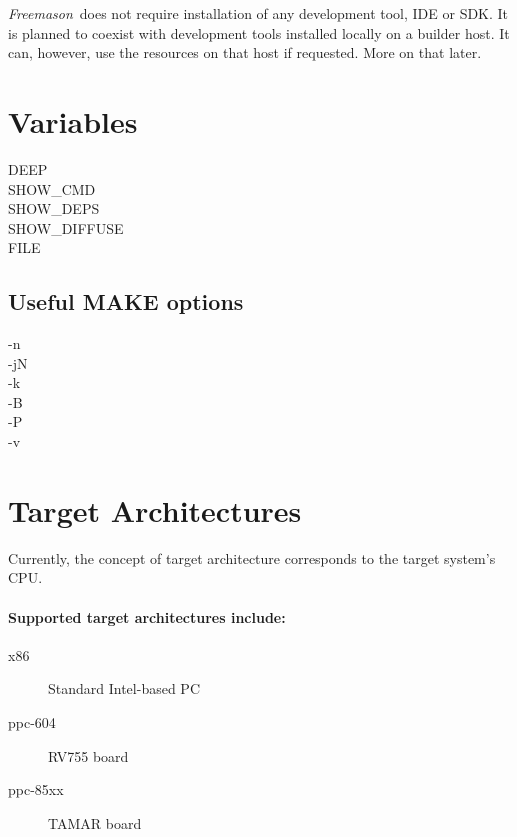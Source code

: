 \documentclass[a4paper]{article}
\newcommand{\freemason}{\textit{Freemason}}
\begin{document}
\freemason\ does not require installation of any development tool, IDE or SDK. It is planned to coexist with development
tools installed locally on a builder host. It can, however, use the resources on that host if requested. More on that
later.

\section{Variables}
\begin{description}
  \item[DEEP]
  \item[SHOW\_CMD]
  \item[SHOW\_DEPS]
  \item[SHOW\_DIFFUSE]
  \item[FILE]
\end{description}

\subsection{Useful MAKE options}
\begin{description}
  \item[-n]
  \item[-jN]
  \item[-k]
  \item[-B]
  \item[-P]
  \item[-v]
\end{description}

\section{Target Architectures}
Currently, the concept of target architecture corresponds to the target system's CPU.
\paragraph{Supported target architectures include:}
\begin{description}
  \item[x86] Standard Intel-based PC
  \item[ppc-604] RV755 board
  \item[ppc-85xx] TAMAR board
\end{description}
\end{document}
